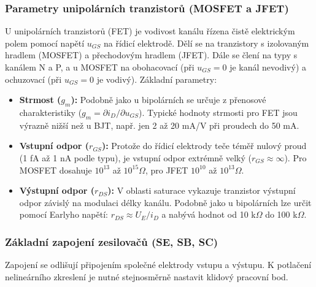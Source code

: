     \subsubsection{Parametry unipolárních tranzistorů (MOSFET a JFET)}
        U unipolárních tranzistorů (FET) je vodivost kanálu řízena čistě elektrickým polem pomocí napětí $u_{GS}$ na řídicí elektrodě. Dělí se na tranzistory s izolovaným hradlem (MOSFET) a přechodovým hradlem (JFET). Dále se člení na typy s kanálem N a P, a u MOSFET na obohacovací (při $u_{GS} = 0$ je kanál nevodivý) a ochuzovací (při $u_{GS} = 0$ je vodivý). Základní parametry:
        
        \begin{itemize}
            \item \textbf{Strmost ($g_m$):} Podobně jako u bipolárních se určuje z přenosové charakteristiky ($g_m = \partial i_D / \partial u_{GS}$). Typické hodnoty strmosti pro FET jsou výrazně nižší než u BJT, např. jen 2 až 20 mA/V při proudech do 50 mA.
            \item \textbf{Vstupní odpor ($r_{GS}$):} Protože do řídicí elektrody teče téměř nulový proud (1 fA až 1 nA podle typu), je vstupní odpor extrémně velký ($r_{GS} \approx \infty$). Pro MOSFET dosahuje $10^{13}$ až $10^{15} \Omega$, pro JFET $10^{10}$ až $10^{13} \Omega$.
            \item \textbf{Výstupní odpor ($r_{DS}$):} V oblasti saturace vykazuje tranzistor výstupní odpor závislý na modulaci délky kanálu. Podobně jako u bipolárních lze určit pomocí Earlyho napětí: $r_{DS} \approx U_E / i_D$ a nabývá hodnot od 10 k$\Omega$ do 100 k$\Omega$.
        \end{itemize}
    \subsubsection{Základní zapojení zesilovačů (SE, SB, SC)}

        Zapojení se odlišují připojením společné elektrody vstupu a výstupu. K potlačení nelineárního zkreslení je nutné stejnosměrně nastavit klidový pracovní bod.
        
